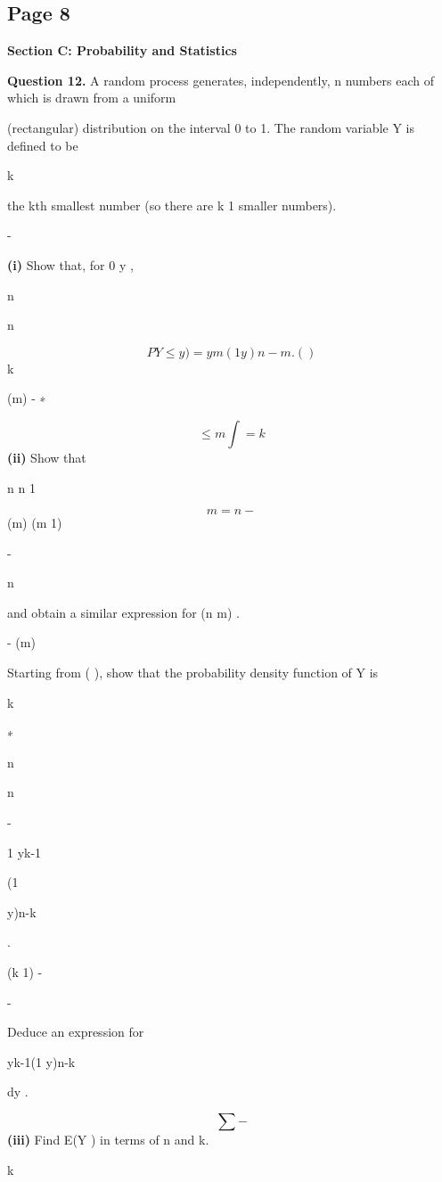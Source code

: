 \documentclass[12pt]{article}
\begin{document}
\subsection*{Page 8}
\begin{flushleft}
\bigskip\textbf{Section C: Probability and Statistics}\par
\bigskip\textbf{Question 12.} A random process generates, independently, n numbers each of which is drawn from a uniform\par
(rectangular) distribution on the interval 0 to 1. The random variable Y is defined to be\par
k\par
the kth smallest number (so there are k 1 smaller numbers).\par
-\par
\textbf{(i)} Show that, for 0 \leq y  ,\par
n\par
n\par
\[P Y \leq y) = ym (1 y)n-m . ( )\]
k\par
(m) - ∗\par
\[\leq m\int=k\]
\textbf{(ii)} Show that\par
n n 1\par
\[m = n -\]
(m) (m 1)\par
-\par
n\par
and obtain a similar expression for (n m) .\par
- (m)\par
Starting from ( ), show that the probability density function of Y is\par
k\par
∗\par
n\par
n\par
-\par
1 yk-1\par
(1\par
y)n-k\par
.\par
(k 1) -\par
-\par
Deduce an expression for\par
yk-1(1 y)n-k\par
dy .\par
\[\sum -\]
\textbf{(iii)} Find E(Y ) in terms of n and k.\par
k\par
\end{flushleft}
\end{document}
